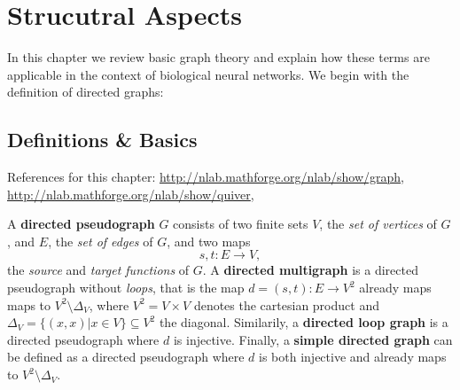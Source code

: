 \chapter{Strucutral Aspects}\label{ch:Graph Theory} %
In this chapter we review basic graph theory and explain how these
terms are applicable in the context of biological neural networks. We
begin with the definition of directed graphs:

\section{Definitions \& Basics}

References for this chapter:
\url{http://nlab.mathforge.org/nlab/show/graph},
\url{http://nlab.mathforge.org/nlab/show/quiver}, \parencite{Bang-Jensen_Digraphs} 








\begin{defn}
  A \textbf{directed pseudograph} $G$ consists of two finite  sets $V$, the \textit{set of vertices} of $G$, and
  $E$, the \textit{set of edges} of $G$, and two maps
  \[
  s,t: E \to V,
  \]
  the \textit{source} and \textit{target functions} of $G$. A
  \textbf{directed multigraph} is a directed pseudograph without
  \textit{loops}, that is the map $d = (s,t):E \to V^2$ already maps
  maps to $V^2\setminus\Delta_V$, where $V^2 = V \times V$ denotes the
  cartesian product and $\Delta_V = \{(x,x)|x \in V\} \subseteq V^2$
  the diagonal. Similarily, a \textbf{directed loop graph} is a
  directed pseudograph where $d$ is injective. Finally, a
  \textbf{simple directed graph} can be defined as a directed
  pseudograph where $d$ is both injective and already maps to
  $V^2\setminus\Delta_V$.
\end{defn}


